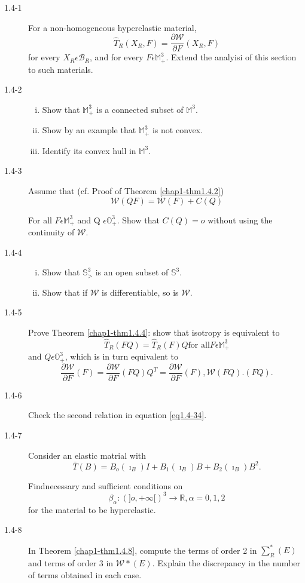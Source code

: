 \begin{description}
\item[1.4-1] For a non-homogeneous hyperelastic material, 
  $$
  \hat{T}_R (X_R, F) = \frac{\partial \mathcal{W}} {\partial F} (X_R, F)
  $$
  for every $X_R \epsilon \mathcal{B}_R$, and for every $F
  \epsilon \mathbb{M}^3_+$. Extend the analyisi of this section to
  such materials. 

\item[1.4-2]
  \begin{enumerate}[(i)]
  \item Show that $\mathbb{M}^3_+$ is a connected subset of $\mathbb{M}^3$.
  \item Show by an example that $\mathbb{M}^3_+$ is not convex.
  \item Identify its convex hull in $\mathbb{M}^3$.
  \end{enumerate}

\item[1.4-3] Assume that (cf. Proof of Theorem \ref{chap1-thm1.4.2})
  $$
  \mathcal{W}(QF) = \mathcal{W} (F) + C(Q)
  $$

  For all $F \epsilon \mathbb{M}^3_+$ and Q $ \epsilon
  \mathbb{O}^3_+$. Show that $C(Q) = o$ without using the continuity
  of $\mathcal{W}$. 

\item[1.4-4]
  \begin{enumerate}[(i)]
  \item Show that $\mathbb{S}^3_>$ is an open subset of $\mathbb{S}^3$.
  \item Show that if $\mathcal{W}$ is differentiable, so is $\mathcal{W}$.
  \end{enumerate}

\item[1.4-5] Prove Theorem \ref{chap1-thm1.4.4}: show that isotropy is
  equivalent to 
  $$
  \hat{T}_R (FQ) = \hat{T}_R (F)Q \text{for all} F \epsilon \mathbb{M}^3_+
  $$
  and $Q \epsilon \mathbb{O}^3_+$, which is in turn equivalent to 
  $$
  \frac{\partial \mathcal{W}}{\partial F} (F) = \frac{\partial
    \mathcal{W}}{\partial F} (FQ) Q^T = \frac{\partial
    \mathcal{W}}{\partial F} (F), \mathcal{W} (FQ).
  (FQ).  
  $$

\item[1.4-6] Check the second relation in equation \eqref{eq1.4-34}. 

\item[1.4-7] Consider an elastic matrial with
  $$
  \bar{T} (B) = B_o (\imath_B)I + B_1(\imath_B)B + B_2 (\imath_B) B^2. 
  $$

  Find\pageoriginale necessary and sufficient conditions on 
  $$
  \beta_\alpha :(]o, +\infty[)^3 \to \mathbb{R}, \alpha = 0,1,2
    $$
    for the material to be hyperelastic. 

\item[1.4-8] In Theorem \ref{chap1-thm1.4.8}, compute the terms of order 2 in
  $\sum_R^*(E)$ and terms of order 3 in $\mathcal{W} * (E)$. Explain
  the discrepancy in the number of terms obtained in each case. 
\end{description}



